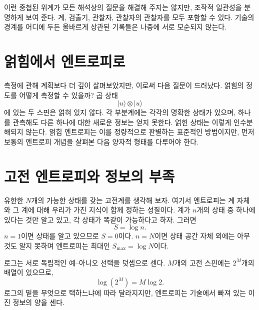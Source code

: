\begin{classroomqa}
\end{classroomqa}

이런 중첩된 위계가 모든 해석상의 질문을 해결해 주지는 않지만, 조작적 일관성을 분명하게 보여 준다. 계, 검출기, 관찰자, 관찰자의 관찰자를 모두 포함할 수 있다. 기술의 경계를 어디에 두든 올바르게 상관된 기록들은 나중에 서로 모순되지 않는다.

\section{얽힘에서 엔트로피로}

측정에 관해 계획보다 더 깊이 살펴보았지만, 이로써 다음 질문이 드러났다. 얽힘의 정도를 어떻게 측정할 수 있을까? 곱 상태
\begin{equation}
|u\rangle\otimes|u\rangle
\end{equation}
에 있는 두 스핀은 얽혀 있지 않다. 각 부분계에는 각각의 명확한 상태가 있으며, 하나를 관측해도 다른 하나에 대한 새로운 정보는 얻지 못한다. 얽힌 상태는 이렇게 인수분해되지 않는다. 얽힘 엔트로피는 이를 정량적으로 판별하는 표준적인 방법이지만, 먼저 보통의 엔트로피 개념을 살펴본 다음 양자적 형태를 다루어야 한다.

\section{고전 엔트로피와 정보의 부족}

유한한 \(N\)개의 가능한 상태를 갖는 고전계를 생각해 보자. 여기서 엔트로피는 계 자체와 그 계에 대해 우리가 가진 지식이 함께 정하는 성질이다. 계가 \(n\)개의 상태 중 하나에 있다는 것만 알고 있고, 각 상태가 똑같이 가능하다고 하자. 그러면
\begin{equation}
S=\log n.
\end{equation}
\(n=1\)이면 상태를 알고 있으므로 \(S=0\)이다. \(n=N\)이면 상태 공간 자체 외에는 아무것도 알지 못하며 엔트로피는 최대인 \(S_{\max}=\log N\)이다.

로그는 서로 독립적인 예--아니오 선택을 덧셈으로 센다. \(M\)개의 고전 스핀에는 \(2^M\)개의 배열이 있으므로,
\begin{equation}
\log(2^M)=M\log 2.
\end{equation}
로그의 밑을 무엇으로 택하느냐에 따라 달라지지만, 엔트로피는 기술에서 빠져 있는 이진 정보의 양을 센다.

